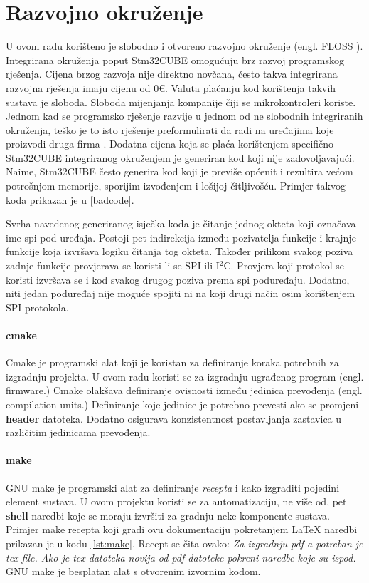 \documentclass[times, utf8, diplomski]{diplomski}
\begin{document}
\chapter{Razvojno okruženje}
U ovom radu korišteno je slobodno i otvoreno razvojno okruženje (engl. FLOSS \cite{FLOSS}). Integrirana okruženja poput Stm32CUBE omogućuju brz razvoj programskog rješenja. Cijena brzog razvoja nije direktno novčana, često takva integrirana razvojna rješenja imaju cijenu od 0€. Valuta plaćanju kod korištenja takvih sustava je sloboda. Sloboda mijenjanja kompanije čiji se mikrokontroleri koriste. Jednom kad se programsko rješenje razvije u jednom od ne slobodnih integriranih okruženja, teško je to isto rješenje preformulirati da radi na uređajima koje proizvodi druga firma \cite{VENDORLOCKIN}. Dodatna cijena koja se plaća korištenjem specifično Stm32CUBE integriranog okruženjem je generiran kod koji nije zadovoljavajući. Naime, Stm32CUBE često generira kod koji je previše općenit i rezultira većom potrošnjom memorije, sporijim izvođenjem i lošijoj čitljivošću. Primjer takvog koda prikazan je u \ref{badcode}.



Svrha navedenog generiranog isječka koda je čitanje jednog okteta koji označava ime spi pod uređaja. Postoji pet indirekcija između pozivatelja funkcije i krajnje funkcije koja izvršava logiku čitanja tog okteta. Također prilikom svakog poziva zadnje funkcije provjerava se koristi li se SPI ili I\(^2\)C. Provjera koji protokol se koristi izvršava se i kod svakog drugog poziva prema spi poduređaju. Dodatno, niti jedan poduređaj nije moguće spojiti ni na koji drugi način osim korištenjem SPI protokola.

\subsubsection{cmake}
Cmake je programski alat koji je koristan za definiranje koraka potrebnih za izgradnju projekta. U ovom radu koristi se za izgradnju ugrađenog program (engl. firmware.) Cmake olakšava definiranje ovisnosti između jedinica prevođenja (engl. compilation units.) Definiranje koje jedinice je potrebno prevesti ako se promjeni \textbf{header} datoteka. Dodatno osigurava konzistentnost postavljanja zastavica u različitim jedinicama prevođenja.

\subsubsection{make}
GNU make je programski alat za definiranje \textit{recepta} i kako izgraditi pojedini element sustava. U ovom projektu koristi se za automatizaciju, ne više od, pet \textbf{shell} naredbi koje se moraju izvršiti za gradnju neke komponente sustava. Primjer make recepta koji gradi ovu dokumentaciju pokretanjem \LaTeX \cite{ungar2002uvod} naredbi prikazan je u kodu \ref{lst:make}. Recept se čita ovako: \textit{Za izgradnju pdf-a potreban je tex file. Ako je tex datoteka novija od pdf datoteke pokreni naredbe koje su ispod.} GNU make je besplatan alat s otvorenim izvornim kodom.
\end{document}
